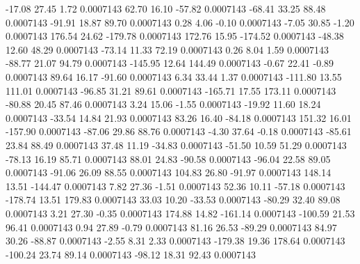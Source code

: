      -17.08       27.45        1.72     0.0007143
       62.70       16.10      -57.82     0.0007143
      -68.41       33.25       88.48     0.0007143
      -91.91       18.87       89.70     0.0007143
        0.28        4.06       -0.10     0.0007143
       -7.05       30.85       -1.20     0.0007143
      176.54       24.62     -179.78     0.0007143
      172.76       15.95     -174.52     0.0007143
      -48.38       12.60       48.29     0.0007143
      -73.14       11.33       72.19     0.0007143
        0.26        8.04        1.59     0.0007143
      -88.77       21.07       94.79     0.0007143
     -145.95       12.64      144.49     0.0007143
       -0.67       22.41       -0.89     0.0007143
       89.64       16.17      -91.60     0.0007143
        6.34       33.44        1.37     0.0007143
     -111.80       13.55      111.01     0.0007143
      -96.85       31.21       89.61     0.0007143
     -165.71       17.55      173.11     0.0007143
      -80.88       20.45       87.46     0.0007143
        3.24       15.06       -1.55     0.0007143
      -19.92       11.60       18.24     0.0007143
      -33.54       14.84       21.93     0.0007143
       83.26       16.40      -84.18     0.0007143
      151.32       16.01     -157.90     0.0007143
      -87.06       29.86       88.76     0.0007143
       -4.30       37.64       -0.18     0.0007143
      -85.61       23.84       88.49     0.0007143
       37.48       11.19      -34.83     0.0007143
      -51.50       10.59       51.29     0.0007143
      -78.13       16.19       85.71     0.0007143
       88.01       24.83      -90.58     0.0007143
      -96.04       22.58       89.05     0.0007143
      -91.06       26.09       88.55     0.0007143
      104.83       26.80      -91.97     0.0007143
      148.14       13.51     -144.47     0.0007143
        7.82       27.36       -1.51     0.0007143
       52.36       10.11      -57.18     0.0007143
     -178.74       13.51      179.83     0.0007143
       33.03       10.20      -33.53     0.0007143
      -80.29       32.40       89.08     0.0007143
        3.21       27.30       -0.35     0.0007143
      174.88       14.82     -161.14     0.0007143
     -100.59       21.53       96.41     0.0007143
        0.94       27.89       -0.79     0.0007143
       81.16       26.53      -89.29     0.0007143
       84.97       30.26      -88.87     0.0007143
       -2.55        8.31        2.33     0.0007143
     -179.38       19.36      178.64     0.0007143
     -100.24       23.74       89.14     0.0007143
      -98.12       18.31       92.43     0.0007143
